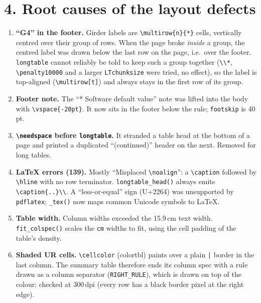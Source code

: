 \documentclass[11pt,a4paper]{article}
\begin{document}
\section*{4. Root causes of the layout defects}
\begin{enumerate}
\item \textbf{``G4'' in the footer.} Girder labels are \verb|\multirow{n}{*}| cells, vertically centred over
their group of rows. When the page broke \emph{inside} a group, the centred label was drawn below the last
row on the page, i.e.\ over the footer. \texttt{longtable} cannot reliably be told to keep such a group
together (\verb|\\*|, \verb|\penalty10000| and a larger \verb|LTchunksize| were tried, no effect), so the label
is top-aligned (\verb|\multirow[t]|) and always stays in the first row of its group.
\item \textbf{Footer note.} The ``* Software default value'' note was lifted into the body with
\verb|\vspace{-20pt}|. It now sits in the footer below the rule; \texttt{footskip} is 40\,pt.
\item \textbf{\texttt{\textbackslash needspace} before \texttt{longtable}.} It stranded a table head at the
bottom of a page and printed a duplicated ``(continued)'' header on the next. Removed for long tables.
\item \textbf{LaTeX errors (139).} Mostly ``Misplaced \verb|\noalign|'': a \verb|\caption| followed by
\verb|\hline| with no row terminator. \verb|longtable_head()| always emits \verb|\caption{..}\\|. A
``less-or-equal'' sign (U+2264) was unsupported by \texttt{pdflatex}; \verb|_tex()| now maps common Unicode
symbols to LaTeX.
\item \textbf{Table width.} Column widths exceeded the 15.9\,cm text width. \verb|fit_colspec()| scales the
\texttt{cm} widths to fit, using the cell padding of the table's density.
\item \textbf{Shaded UR cells.} \verb|\cellcolor| (colortbl) paints over a plain \verb+|+ border in the
last column. The summary table therefore ends its column spec with a rule drawn as a column separator
(\verb|RIGHT_RULE|), which is drawn on top of the colour; checked at 300\,dpi (every row has a black border
pixel at the right edge).
\end{enumerate}
\end{document}
